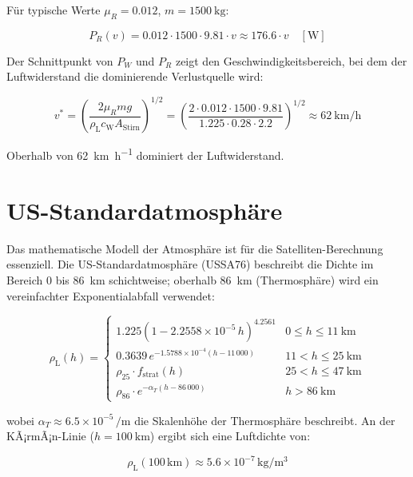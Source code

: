 ﻿\documentclass[12pt, a4paper]{report}
\theoremstyle{definition}
\theoremstyle{remark}
\newcommand{\rhoL}{\rho_{\text{L}}}
\newcommand{\cW}{c_{\text{W}}}
\newcommand{\Astirnfl}{A_{\text{Stirn}}}
\begin{document}
Für typische Werte $\mu_R = 0.012$, $m = \SI{1500}{\kilo\gram}$:

\begin{equation}
  P_R(v) = 0.012 \cdot 1500 \cdot 9.81 \cdot v \approx 176.6 \cdot v \quad [\si{\watt}]
  \label{eq:pr_param}
\end{equation}

Der Schnittpunkt von $P_W$ und $P_R$ zeigt den Geschwindigkeitsbereich, bei dem
der Luftwiderstand die dominierende Verlustquelle wird:

\begin{equation}
  v^* = \left(\frac{2\mu_R m g}{\rhoL \cW \Astirnfl}\right)^{1/2}
      = \left(\frac{2 \cdot 0.012 \cdot 1500 \cdot 9.81}{1.225 \cdot 0.28 \cdot 2.2}\right)^{1/2}
      \approx \SI{62}{\kilo\metre\per\hour}
  \label{eq:v_kreuzung}
\end{equation}

Oberhalb von \SI{62}{\kilo\metre\per\hour} dominiert der Luftwiderstand.

\section{US-Standardatmosphäre}

Das mathematische Modell der Atmosphäre ist für die Satelliten-Berechnung essenziell.
Die US-Standardatmosphäre (USSA76) beschreibt die Dichte im Bereich 0 bis \SI{86}{\kilo\metre}
schichtweise; oberhalb \SI{86}{\kilo\metre} (Thermosphäre) wird ein vereinfachter
Exponentialabfall verwendet:

\begin{equation}
  \rhoL(h) =
  \begin{cases}
    1.225\left(1 - 2.2558 \times 10^{-5}\,h\right)^{4.2561} & 0 \le h \le \SI{11}{\kilo\metre} \\
    0.3639\,e^{-1.5788 \times 10^{-4}(h - 11\,000)} & 11 < h \le \SI{25}{\kilo\metre} \\
    \rho_{25} \cdot f_{\text{strat}}(h) & 25 < h \le \SI{47}{\kilo\metre} \\
    \rho_{86} \cdot e^{-\alpha_T (h - 86\,000)} & h > \SI{86}{\kilo\metre}
  \end{cases}
  \label{eq:ussa76}
\end{equation}

wobei $\alpha_T \approx 6.5 \times 10^{-5}\,\si{\per\metre}$ die Skalenhöhe der
Thermosphäre beschreibt. An der KÃ¡rmÃ¡n-Linie ($h = \SI{100}{\kilo\metre}$) ergibt
sich eine Luftdichte von:

\begin{equation}
  \rhoL(100\,\text{km}) \approx 5.6 \times 10^{-7}\,\si{\kilo\gram\per\cubic\metre}
  \label{eq:rho100}
\end{equation}
\end{document}
